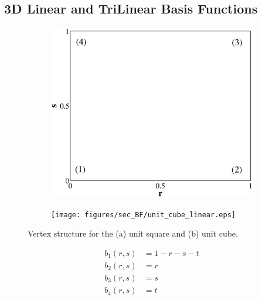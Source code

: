 \subsection{3D Linear and TriLinear Basis Functions}
\label{sec::BF_3DLinear_TriL}

\begin{figure}
\centering
	\begin{subfigure}[b]{0.45\textwidth}
		\centering
		\label{subfig::unit_square}
		\includegraphics[width=\textwidth]{figures/sec_BF/unit_square_linear.eps}
		\caption{}
	\end{subfigure}
	\hfill
	\begin{subfigure}[b]{0.45\textwidth}
		\centering
		\label{subfig::unit_cube}
		\texttt{[image: figures/sec\_BF/unit\_cube\_linear.eps]}
		\caption{}
	\end{subfigure}
\caption{Vertex structure for the (a) unit square and (b) unit cube.}
\label{fig::BF_3D_unit_tet_cube}
\end{figure}

\begin{equation}
\label{eq::3D_lin_basis_functions}
\begin{aligned}
	b_1(r,s) & = 1-r-s-t \\
	b_2(r,s) & = r \\
	b_3(r,s) & = s \\
	b_4(r,s) & = t
\end{aligned}
\end{equation}

